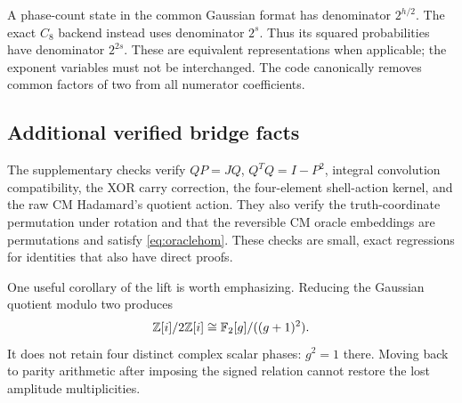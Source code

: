 A phase-count state in the common Gaussian format has denominator $2^{h/2}$. The exact $C_8$ backend instead uses denominator $2^s$. Thus its squared probabilities have denominator $2^{2s}$. These are equivalent representations when applicable; the exponent variables must not be interchanged. The code canonically removes common factors of two from all numerator coefficients.

\subsection{Additional verified bridge facts}
The supplementary checks verify $QP=JQ$, $Q^TQ=I-P^2$, integral convolution compatibility, the XOR carry correction, the four-element shell-action kernel, and the raw CM Hadamard's quotient action. They also verify the truth-coordinate permutation under rotation and that the reversible CM oracle embeddings are permutations and satisfy \cref{eq:oraclehom}. These checks are small, exact regressions for identities that also have direct proofs.

One useful corollary of the lift is worth emphasizing. Reducing the Gaussian quotient modulo two produces
\begin{equation}
 \mathbb Z[i]/2\mathbb Z[i]\cong\mathbb F_2[g]/((g+1)^2).
\end{equation}
It does not retain four distinct complex scalar phases: $g^2=1$ there. Moving back to parity arithmetic after imposing the signed relation cannot restore the lost amplitude multiplicities.

